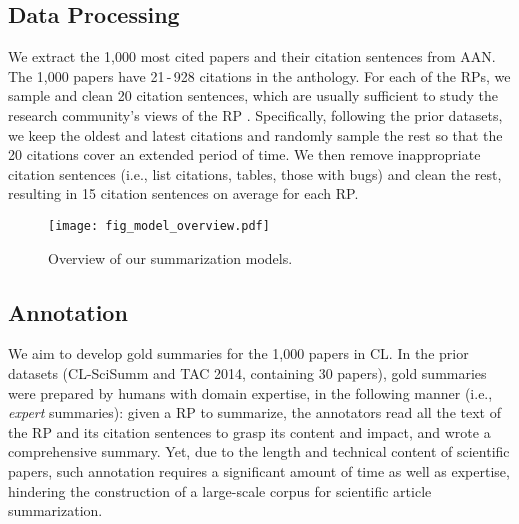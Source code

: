 \documentclass[letterpaper]{article} \usepackage{aaai19}  \usepackage{times}  \usepackage{helvet}  \usepackage{courier}  \usepackage{url}
\begin{document}
\subsection{Data Processing}
We extract the 1,000 most cited papers and their citation sentences from
AAN.
The 1,000 papers have 21\,-\,928 citations in the anthology.
For each of the RPs, we sample and clean 20 citation sentences, which are usually sufficient to study the research community's views of the RP \cite{mei-zhai:2008:ACLMain}.
Specifically, following the prior datasets, we keep the oldest and latest citations and randomly sample the rest so that the 20 citations cover an extended period of time.
We then remove inappropriate citation sentences (i.e., list citations, tables, those with bugs) and clean the rest, resulting in 15 citation sentences on average for each RP.

\begin{figure*}[!t]
    \vspace{0mm}\hspace{-1.5mm}
    \centering
    \texttt{[image: fig\_model\_overview.pdf]}\vspace{-2mm}
    \caption{Overview of our summarization models.
    }
\label{fig:model_overview}
\vspace{-3mm}
\end{figure*}

\subsection{Annotation}


We aim to develop gold summaries for the 1,000 papers in CL.
In the prior datasets (CL-SciSumm and TAC 2014, containing 30 papers), gold summaries were prepared by humans with domain expertise, in the following manner
(i.e., {\it expert} summaries):
given a RP to summarize, the annotators
read all the text of the RP and its citation sentences to grasp its content and impact, and wrote a comprehensive summary.
Yet, due to the length and technical content of scientific papers, such annotation requires a significant amount of time as well as expertise, hindering the construction of a large-scale corpus for scientific article summarization.
\end{document}
